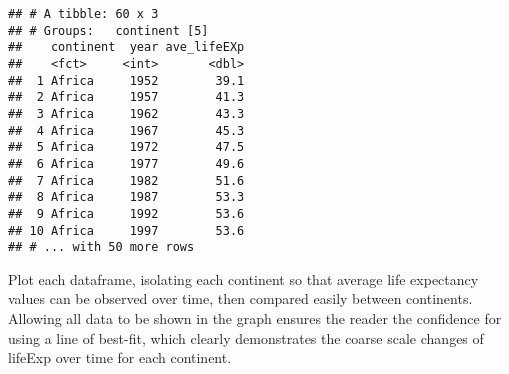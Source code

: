 \documentclass[]{article}
\newenvironment{Shaded}{\begin{snugshade}}{\end{snugshade}}
\newcommand{\DataTypeTok}[1]{\textcolor[rgb]{0.13,0.29,0.53}{#1}}
\newcommand{\DecValTok}[1]{\textcolor[rgb]{0.00,0.00,0.81}{#1}}
\newcommand{\KeywordTok}[1]{\textcolor[rgb]{0.13,0.29,0.53}{\textbf{#1}}}
\newcommand{\NormalTok}[1]{#1}
\newcommand{\OperatorTok}[1]{\textcolor[rgb]{0.81,0.36,0.00}{\textbf{#1}}}
\newcommand{\StringTok}[1]{\textcolor[rgb]{0.31,0.60,0.02}{#1}}
\begin{document}
\begin{Shaded}
\end{Shaded}

\begin{verbatim}
## # A tibble: 60 x 3
## # Groups:   continent [5]
##    continent  year ave_lifeEXp
##    <fct>     <int>       <dbl>
##  1 Africa     1952        39.1
##  2 Africa     1957        41.3
##  3 Africa     1962        43.3
##  4 Africa     1967        45.3
##  5 Africa     1972        47.5
##  6 Africa     1977        49.6
##  7 Africa     1982        51.6
##  8 Africa     1987        53.3
##  9 Africa     1992        53.6
## 10 Africa     1997        53.6
## # ... with 50 more rows
\end{verbatim}

Plot each dataframe, isolating each continent so that average life
expectancy values can be observed over time, then compared easily
between continents. Allowing all data to be shown in the graph ensures
the reader the confidence for using a line of best-fit, which clearly
demonstrates the coarse scale changes of lifeExp over time for each
continent.

\begin{Shaded}
\end{Shaded}
\end{document}

